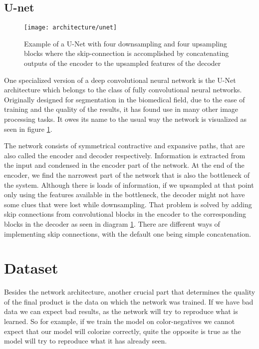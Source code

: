 \subsection{U-net}

\begin{figure}[!h]
	\centering
	\texttt{[image: architecture/unet]}
    \caption{Example of a U-Net with four downsampling and four upsampling blocks 
	where the skip-connection is accomplished by concatenating outputs of the 
	encoder to the upsampled features of the decoder}
	\label{fig:unet}
\end{figure}

One specialized version of a deep convolutional neural network is the U-Net 
architecture which belongs to the class of fully convolutional neural networks. 
Originally designed for segmentation in the biomedical field, due to the ease
of training and the quality of the results, it has found use in many other 
image processing tasks. It owes its name to the usual way the network is 
visualized as seen in figure \ref{fig:unet}.

The network consists of symmetrical contractive and expansive paths, that are also
called the encoder and decoder respectively. Information is extracted from
the input and condensed in the encoder part of the network. At the end of the 
encoder, we find the narrowest part of the network that is also the bottleneck 
of the system. Although there is loads of information, if we upsampled at that 
point only using the features available in the bottleneck, the decoder might
not have some clues that were lost while downsampling. That problem is 
solved by adding skip connections from convolutional blocks in the encoder to
the corresponding blocks in the decoder as seen in diagram \ref{fig:unet}. 
There are different ways of implementing skip connections, with the default one
being simple concatenation. 

\section{Dataset}
\label{sec:dataset}

Besides the network architecture, another crucial part that determines the quality
of the final product is the data on which the network was trained. If we have bad
data we can expect bad results, as the network will try to reproduce what is learned.
So for example, if we train the model on color-negatives we cannot expect that 
our model will colorize correctly, quite the opposite is true as the model will
try to reproduce what it has already seen. 

